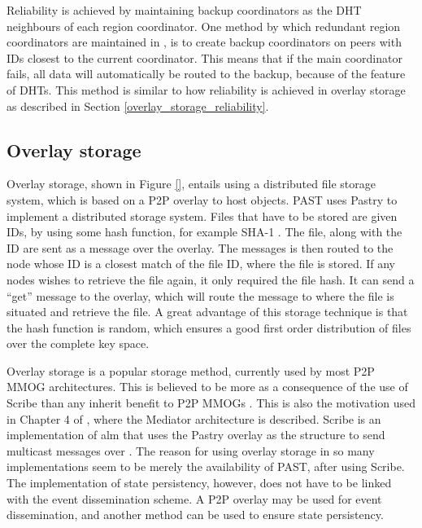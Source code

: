 \documentclass[10pt,a4paper,journal,cspaper,compsoc]{IEEEtran}
\begin{document}
Reliability is achieved by maintaining backup coordinators as the DHT neighbours of each region coordinator. One method by which redundant region
coordinators are maintained in \cite{knutsson_p2p_first}, is to create backup coordinators on peers with IDs closest to the current coordinator. This
means that if the main coordinator fails, all data will automatically be routed to the backup, because of the feature of DHTs. This method is similar
to how reliability is achieved in overlay storage as described in Section \ref{overlay_storage_reliability}.

\subsection{Overlay storage}
\label{overlay_storage}

Overlay storage, shown in Figure \ref{}, entails using a distributed file storage system, which is based on a P2P overlay to host objects. PAST
\cite{PAST_storage} uses Pastry to implement a distributed storage system. Files that have to be stored are given IDs, by using some hash function,
for example SHA-1 \cite{SHA}. The file, along with the ID are sent as a message over the overlay. The messages is then routed to the node whose ID is
a closest match of the file ID, where the file is stored. If any nodes wishes to retrieve the file again, it only required the file hash. It can send
a ``get'' message to the overlay, which will route the message to where the file is situated and retrieve the file. A great advantage of this storage
technique is that the hash function is random, which ensures a good first order distribution of files over the complete key space.


Overlay storage is a popular storage method, currently used by most P2P MMOG architectures. This is believed to be more as a consequence of the use
of Scribe than any inherit benefit to P2P MMOGs \cite{past_storage_focus}. This is also the motivation used in Chapter 4 of \cite{Fan_phd}, where the
Mediator architecture is described. Scribe is an implementation of \ac{alm} that uses the Pastry overlay as the structure to send multicast messages
over \cite{scribe}. The reason for using overlay storage in so many implementations seem to be merely the availability of PAST, after using Scribe.
The implementation of state persistency, however, does not have to be linked with the event dissemination scheme. A P2P overlay may be used for event
dissemination, and another method can be used to ensure state persistency.
\end{document}
